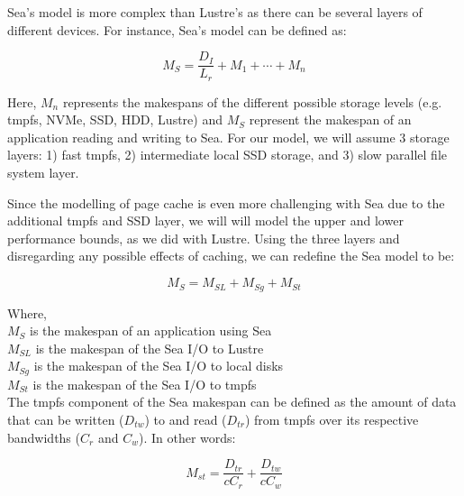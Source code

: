 \documentclass[10pt,journal,compsoc]{IEEEtran}
\begin{document}
      Sea's model is more complex than Lustre's as there can be several layers
      of different devices. For instance, Sea's model can be defined as:

      \begin{equation}\label{eq:sea-comp:sea}
          M_{S} = \frac{D_{I}}{L_{r}} + M_{1} + \cdots + M_{n}
      \end{equation}

      Here, $M_{n}$ represents the makespans of the different possible storage
      levels (e.g. tmpfs, NVMe, SSD, HDD, Lustre) and $M_{S}$ represent the
      makespan of an application reading and writing to Sea. For our model, we
      will assume 3 storage layers: 1) fast tmpfs, 2) intermediate local SSD
      storage, and 3) slow parallel file system layer.

      Since the modelling of page cache is even more challenging with Sea due to
      the additional tmpfs and SSD layer, we will will model the upper and lower
      performance bounds, as we did with Lustre. Using the three layers and
      disregarding any possible effects of caching, we can redefine the Sea
      model to be:

      \begin{equation}\label{eq:sea-comp:snc}
          M_{S} = M_{SL} + M_{Sg} + M_{St}
      \end{equation}

      Where, \\
      $M_{S}$ is the makespan of an application using Sea \\
      $M_{SL}$ is the makespan of the Sea I/O to Lustre \\
      $M_{Sg}$ is the makespan of the Sea I/O to local disks \\
      $M_{St}$ is the makespan of the Sea I/O to tmpfs \\



      The tmpfs component of the Sea makespan can be defined as the amount of
      data that can be written ($D_{tw}$) to and read ($D_{tr}$) from tmpfs over
      its respective bandwidths ($C_{r}$ and $C_{w}$). In other words:

      \begin{equation}\label{eq:sea-comp:mst}
          M_{st} = \frac{D_{tr}}{cC_{r}} + \frac{D_{tw}}{cC_{w}}
      \end{equation}
\end{document}
